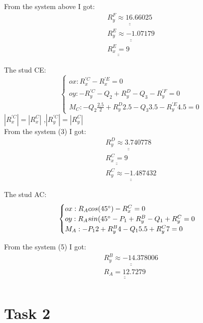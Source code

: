 \documentclass[a4paper,11pt,oneside,article]{memoir}
\def\doubleunderline#1{\underline{\underline{#1}}}
\begin{document}
From the system above I got:
\begin{equation}
    \begin{split}
    \doubleunderline{R^F_y \approx 16.66025}\\
    \doubleunderline{R^E_y \approx -1.07179}\\
    \doubleunderline{R^E_x =9}
     \end{split}
\end{equation}

The stud CE:
\begin{equation}
    \begin{cases}
    ox: R^{'C}_x - R^{'E}_x = 0\\
    oy: - R^{'C}_y - Q_2 + R^D_y - Q_3 - R^{'F}_y = 0\\
    M_C: -Q_2 \frac{2.5}{2}+ R^D_y 2.5 - Q_3 3.5 - R^{'E}_y 4.5 = 0
     \end{cases}
\end{equation}
$|R^{'C}_x| = |R^{C}_x|$ ,$|R^{'C}_y| = |R^{C}_y|$  \\
From the system (3) I got:
\begin{equation}
    \begin{split}
    \doubleunderline{R^D_y \approx 3.740778}\\
    \doubleunderline{R^C_x = 9}\\
    \doubleunderline{R^C_y \approx -1.487432}
     \end{split}
\end{equation}

The stud AC:
\begin{equation}
    \begin{cases}
    ox: R_A cos(45\degree) - R^{C}_x = 0\\
    oy: R_A sin(45\degree - P_1 + R^B_y - Q_1 + R^C_y = 0\\
    M_A: -P_1 2 + R^B_y 4 - Q_1 5.5 + R^C_y 7 =  0
     \end{cases}
\end{equation}

From the system (5) I got:
\begin{equation}
    \begin{split}
    \doubleunderline{R^B_y \approx -14.378006}\\
    \doubleunderline{R_A = 12.7279}\\
     \end{split}
\end{equation}

\section*{Task 2}
\end{document}
